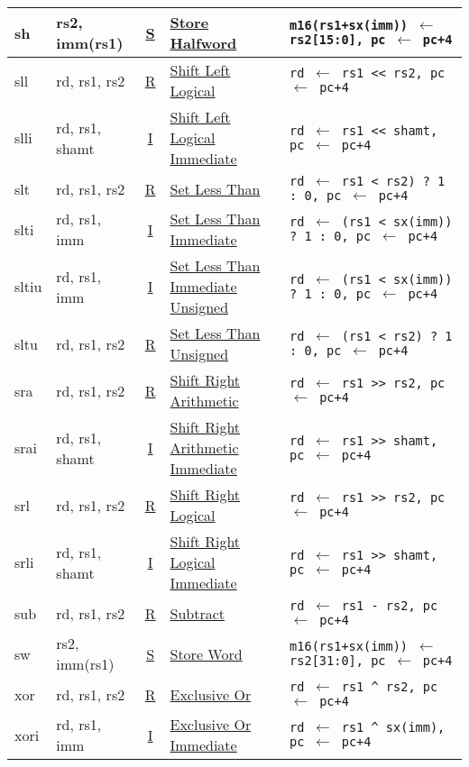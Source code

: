 {\begin{tabular}{|ll|c|l|l|}
\hline
sh    & rs2, imm(rs1) & \hyperref[insnformat:stype]{S} & \hyperref[insn:sh]{Store Halfword}              & {\tt m16(rs1+sx(imm)) $\leftarrow$ rs2[15:0], pc $\leftarrow$ pc+4}\\
\hline
sll   & rd, rs1, rs2   & \hyperref[insnformat:rtype]{R} & \hyperref[insn:sll]{Shift Left Logical}        & {\tt rd $\leftarrow$ rs1 << rs2, pc $\leftarrow$ pc+4}\\
\hline
slli  & rd, rs1, shamt & \hyperref[insnformat:itype]{I} & \hyperref[insn:slli]{Shift Left Logical Immediate} & {\tt rd $\leftarrow$ rs1 << shamt, pc $\leftarrow$ pc+4}\\
\hline
slt   & rd, rs1, rs2   & \hyperref[insnformat:rtype]{R} & \hyperref[insn:slt]{Set Less Than}             & {\tt rd $\leftarrow$ rs1 < rs2) ? 1 : 0, pc $\leftarrow$ pc+4}\\
\hline
slti  & rd, rs1, imm  & \hyperref[insnformat:itype]{I} & \hyperref[insn:slti]{Set Less Than Immediate}   & {\tt rd $\leftarrow$ (rs1 < sx(imm)) ? 1 : 0, pc $\leftarrow$ pc+4}\\
\hline
sltiu & rd, rs1, imm  & \hyperref[insnformat:itype]{I} & \hyperref[insn:sltiu]{Set Less Than Immediate Unsigned} & {\tt rd $\leftarrow$ (rs1 < sx(imm)) ? 1 : 0, pc $\leftarrow$ pc+4}\\
\hline
sltu  & rd, rs1, rs2   & \hyperref[insnformat:rtype]{R} & \hyperref[insn:sltu]{Set Less Than Unsigned}   & {\tt rd $\leftarrow$ (rs1 < rs2) ? 1 : 0, pc $\leftarrow$ pc+4}\\
\hline
sra   & rd, rs1, rs2   & \hyperref[insnformat:rtype]{R} & \hyperref[insn:sra]{Shift Right Arithmetic}    & {\tt rd $\leftarrow$ rs1 >> rs2, pc $\leftarrow$ pc+4}\\
\hline
srai  & rd, rs1, shamt & \hyperref[insnformat:itype]{I} & \hyperref[insn:srai]{Shift Right Arithmetic Immediate} & {\tt rd $\leftarrow$ rs1 >> shamt, pc $\leftarrow$ pc+4}\\
\hline
srl   & rd, rs1, rs2   & \hyperref[insnformat:rtype]{R} & \hyperref[insn:srl]{Shift Right Logical}       & {\tt rd $\leftarrow$ rs1 >> rs2, pc $\leftarrow$ pc+4}\\
\hline
srli  & rd, rs1, shamt & \hyperref[insnformat:itype]{I} & \hyperref[insn:srli]{Shift Right Logical Immediate} & {\tt rd $\leftarrow$ rs1 >> shamt, pc $\leftarrow$ pc+4}\\
\hline
sub   & rd, rs1, rs2   & \hyperref[insnformat:rtype]{R} & \hyperref[insn:sub]{Subtract}                  & {\tt rd $\leftarrow$ rs1 - rs2, pc $\leftarrow$ pc+4}\\
\hline
sw    & rs2, imm(rs1) & \hyperref[insnformat:stype]{S} & \hyperref[insn:sw]{Store Word}                  & {\tt m16(rs1+sx(imm)) $\leftarrow$ rs2[31:0], pc $\leftarrow$ pc+4}\\
\hline
xor   & rd, rs1, rs2   & \hyperref[insnformat:rtype]{R} & \hyperref[insn:xor]{Exclusive Or}              & {\tt rd $\leftarrow$ rs1 \^{} rs2, pc $\leftarrow$ pc+4}\\
\hline
xori  & rd, rs1, imm  & \hyperref[insnformat:itype]{I} & \hyperref[insn:xori]{Exclusive Or Immediate}    & {\tt rd $\leftarrow$ rs1 \^{} sx(imm), pc $\leftarrow$ pc+4}\\
\hline
\end{tabular}
}
